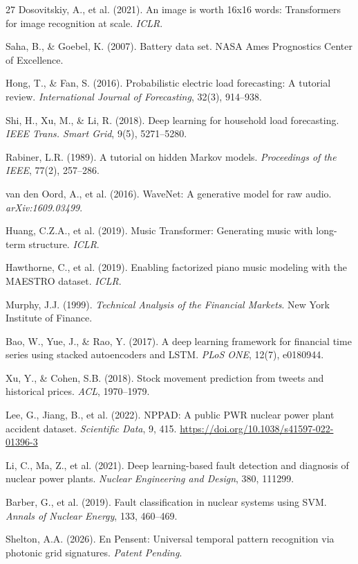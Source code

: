 \documentclass[12pt,a4paper]{article}
\begin{document}
\begin{thebibliography}{27}
Dosovitskiy, A., et al. (2021). An image is worth 16x16 words: Transformers for image recognition
at scale. \emph{ICLR}.

Saha, B., \& Goebel, K. (2007). Battery data set. NASA Ames Prognostics Center of Excellence.

Hong, T., \& Fan, S. (2016). Probabilistic electric load forecasting: A tutorial review.
\emph{International Journal of Forecasting}, 32(3), 914--938.

Shi, H., Xu, M., \& Li, R. (2018). Deep learning for household load forecasting.
\emph{IEEE Trans. Smart Grid}, 9(5), 5271--5280.

Rabiner, L.R. (1989). A tutorial on hidden Markov models. \emph{Proceedings of the IEEE}, 77(2), 257--286.

van den Oord, A., et al. (2016). WaveNet: A generative model for raw audio.
\emph{arXiv:1609.03499}.

Huang, C.Z.A., et al. (2019). Music Transformer: Generating music with long-term structure. \emph{ICLR}.

Hawthorne, C., et al. (2019). Enabling factorized piano music modeling with the MAESTRO dataset.
\emph{ICLR}.

Murphy, J.J. (1999). \emph{Technical Analysis of the Financial Markets}. New York Institute of Finance.

Bao, W., Yue, J., \& Rao, Y. (2017). A deep learning framework for financial time series using
stacked autoencoders and LSTM. \emph{PLoS ONE}, 12(7), e0180944.

Xu, Y., \& Cohen, S.B. (2018). Stock movement prediction from tweets and historical prices.
\emph{ACL}, 1970--1979.

Lee, G., Jiang, B., et al. (2022). NPPAD: A public PWR nuclear power plant accident dataset.
\emph{Scientific Data}, 9, 415. \url{https://doi.org/10.1038/s41597-022-01396-3}

Li, C., Ma, Z., et al. (2021). Deep learning-based fault detection and diagnosis of nuclear power
plants. \emph{Nuclear Engineering and Design}, 380, 111299.

Barber, G., et al. (2019). Fault classification in nuclear systems using SVM.
\emph{Annals of Nuclear Energy}, 133, 460--469.

Shelton, A.A. (2026). En Pensent: Universal temporal pattern recognition via photonic grid
signatures. \emph{Patent Pending}.
\end{thebibliography}
\end{document}
